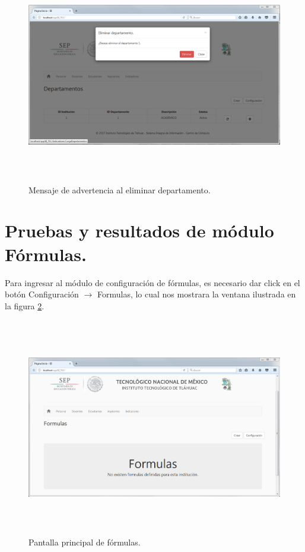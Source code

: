 		    \begin{figure}[]
		        \centering
		        \includegraphics[width=16cm, height=9.5cm]{figuras/DepartamentosElimina}
		        \caption{Mensaje de advertencia al eliminar departamento.}
		        \label{fig_DepartamentoElimina}
		    \end{figure}








		\section{Pruebas y resultados de m\'odulo F\'ormulas.}

			Para ingresar al m\'odulo de configuraci\'on de f\'ormulas, es necesario dar click en el bot\'on Configuraci\'on $\rightarrow$ Formulas, lo cual nos mostrara la ventana ilustrada en la figura \ref{fig_Formulas}.


			\begin{figure}[H]
		        \centering
		        \includegraphics[width=16cm, height=9.5cm]{figuras/Formulas}
		        \caption{Pantalla principal de f\'ormulas.}
		        \label{fig_Formulas}
		    \end{figure}
			
